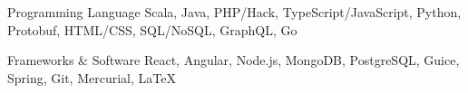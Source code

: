 


\begin{cvskills}


	\cvskill
	{Programming Language} %
	{Scala, Java, PHP/Hack, TypeScript/JavaScript, Python, Protobuf, HTML/CSS, SQL/NoSQL, GraphQL, Go} %


	\cvskill
	{Frameworks \& Software} %
	{React, Angular, Node.js, MongoDB, PostgreSQL, Guice, Spring, Git, Mercurial, \textrm{\LaTeX}} %


\end{cvskills}